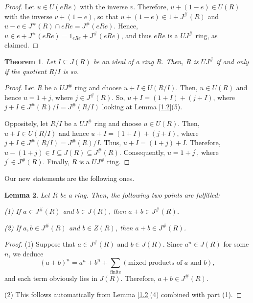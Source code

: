 \documentclass[12pt]{amsart}
\newtheorem{theorem}{Theorem}[section]
\newtheorem{lemma}[theorem]{Lemma}
\theoremstyle{definition}
\begin{document}
\begin{proof}
Let $u \in U(eRe)$ with the inverse $v$. Therefore, $u + (1 - e) \in U(R)$ with the inverse $v + (1 - e)$, so that $u + (1 - e) \in 1 + J^{\#}(R)$ and $u - e \in J^{\#}(R) \cap eRe = J^{\#}(eRe)$. Hence, $u \in e + J^{\#}(eRe) = 1_{eRe} + J^{\#}(eRe)$, and thus $eRe$ is a $UJ^{\#}$ ring, as claimed.
\end{proof}

\begin{theorem}\label{3.5}
Let \(I \subseteq J(R)\) be an ideal of a ring \(R\). Then, \(R\) is $UJ^{\#}$ if and only if the quotient \(R/I\) is so.
\end{theorem}

\begin{proof}
Let \(R\) be a $UJ^{\#}$ ring and choose \(u + I \in U(R/I)\). Then, \(u \in U(R)\) and hence \(u = 1 + j\), where \(j \in J^{\#}(R)\). So, \(u + I= (1+I)+(j+I)\), where \(j + I \in J^{\#}(R)/I = J^{\#}(R/I)\) looking at Lemma \ref{1.2}(5).

Oppositely, let \(R/I\) be a $UJ^{\#}$ ring and choose \(u \in U(R)\). Then, \(u + I \in U(R/I)\) and hence \(u + I = (1 + I) + (j + I)\), where \(j + I \in J^{\#}(R/I)=J^{\#}(R)/I\). Thus, \(u + I = (1 + j) + I\). Therefore, \(u - (1 + j) \in I \subseteq J(R) \subseteq J^{\#}(R)\). Consequently, \(u = 1 + j^\prime\), where \(j^\prime \in J^{\#}(R)\). Finally, \(R\) is a $UJ^{\#}$ ring.
\end{proof}

Our new statements are the following ones.

\begin{lemma}\label{close prod}
Let $R$ be a ring. Then, the following two points are fulfilled:
	
(1) If $a\in J^{\#}(R)$ and $b \in J(R)$, then $a+b \in J^{\#}(R)$.
	
(2) If $a,b \in J^{\#}(R)$ and $b \in Z(R)$, then $a + b \in J^{\#}(R)$.
\end{lemma}

\begin{proof}
(1) Suppose that $a \in J^{\#}(R)$ and $b \in J(R)$. Since $a^n \in J(R)$ for some $n$, we deduce
\[
(a+b)^n = a^n + b^n + \sum_{\text{finite}} (\text{mixed products of } a \text{ and } b),
\]
and each term obviously lies in $J(R)$. Therefore, $a+b \in J^{\#}(R)$.

(2) This follows automatically from Lemma \ref{1.2}(4) combined with part (1).
\end{proof}
\end{document}

